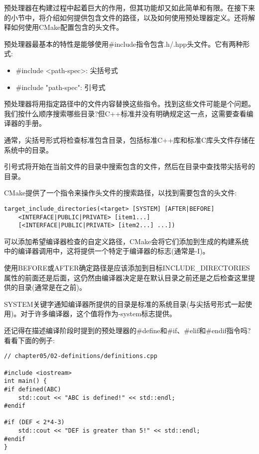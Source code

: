 
预处理器在构建过程中起着巨大的作用，但其功能却又如此简单和有限。在接下来的小节中，将介绍如何提供包含文件的路径，以及如何使用预处理器定义。还将解释如何使用CMake配置包含的头文件。


预处理器最基本的特性是能够使用\#include指令包含.h/.hpp头文件。它有两种形式:

\begin{itemize}
\item 
\#include <path-spec>: 尖括号式

\item 
\#include "path-spec": 引号式
\end{itemize}

预处理器将用指定路径中的文件内容替换这些指令。找到这些文件可能是个问题。我们按什么顺序搜索哪些目录?但C++标准并没有明确规定这一点，这需要查看编译器的手册。

通常，尖括号形式将检查标准包含目录，包括标准C++库和标准C库头文件存储在系统中的目录。

引号式将开始在当前文件的目录中搜索包含的文件，然后在目录中查找带尖括号的目录。

CMake提供了一个指令来操作头文件的搜索路径，以找到需要包含的头文件:

\begin{lstlisting}[style=styleCMake]
target_include_directories(<target> [SYSTEM] [AFTER|BEFORE]
	<INTERFACE|PUBLIC|PRIVATE> [item1...]
	[<INTERFACE|PUBLIC|PRIVATE> [item2...] ...])
\end{lstlisting}

可以添加希望编译器检查的自定义路径，CMake会将它们添加到生成的构建系统中的编译器调用中，这将提供一个特定于编译器的标志(通常是-I)。

使用BEFORE或AFTER确定路径是应该添加到目标INCLUDE\_DIRECTORIES属性的前面还是后面，这仍然由编译器决定是在默认目录之前还是之后检查这里提供的目录(通常是在之前)。

SYSTEM关键字通知编译器所提供的目录是标准的系统目录(与尖括号形式一起使用)。对于许多编译器，这个值将作为-system标志提供。


还记得在描述编译阶段时提到的预处理器的\#define和\#if、\#elif和\#endif指令吗?看看下面的例子:

\begin{lstlisting}[style=styleCXX]
// chapter05/02-definitions/definitions.cpp

#include <iostream>
int main() {
#if defined(ABC)
	std::cout << "ABC is defined!" << std::endl;
#endif

#if (DEF < 2*4-3)
	std::cout << "DEF is greater than 5!" << std::endl;
#endif
}
\end{lstlisting}

